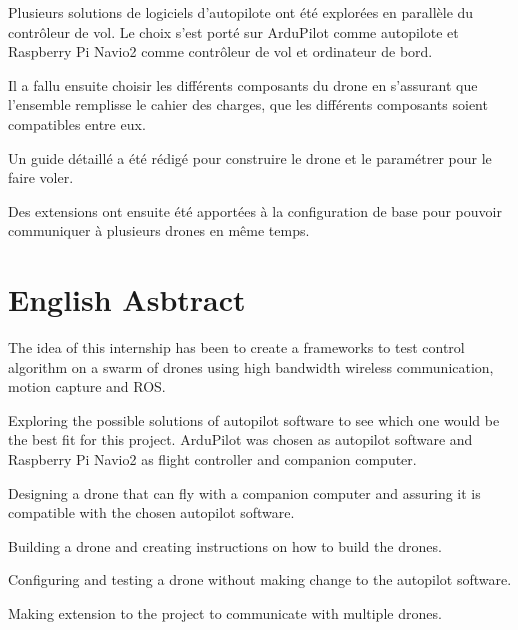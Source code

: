 Plusieurs solutions de logiciels d'autopilote ont été explorées en parallèle du contrôleur de vol. Le choix s'est porté sur ArduPilot comme autopilote et Raspberry Pi Navio2 comme contrôleur de vol et ordinateur de bord.

Il a fallu ensuite choisir les différents composants du drone en s'assurant que l'ensemble remplisse le cahier des charges, que les différents composants soient compatibles entre eux.

Un guide détaillé a été rédigé pour construire le drone et le paramétrer pour le faire voler.

Des extensions ont ensuite été apportées à la configuration de base pour pouvoir communiquer à plusieurs drones en même temps.


\section*{English Asbtract}
The idea of this internship has been to create a frameworks to test control algorithm on a swarm of drones using high bandwidth wireless communication, motion capture and ROS.

Exploring the possible solutions of autopilot software to see which one would be the best fit for this project. ArduPilot was chosen as autopilot software and Raspberry Pi Navio2 as flight controller and companion computer.

Designing a drone that can fly with a companion computer and assuring it is compatible with the chosen autopilot software.

Building a drone and creating instructions on how to build the drones.

Configuring and testing a drone without making change to the autopilot software.

Making extension to the project to communicate with multiple drones.
